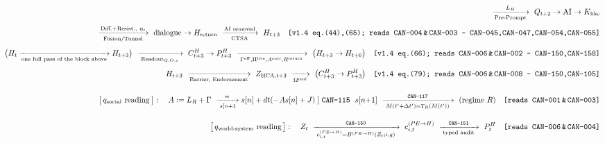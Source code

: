 \begin{equation}
\begin{aligned}
 \ \xrightarrow[\text{Pre-Prompt}]{L_H}\ Q_{t+2}\to\mathrm{AI}\to K_{\mathrm{like}}\\[2pt]
 \xrightarrow[\text{Fusion/Tunnel}]{\text{Diff.}+\text{Resist.},\ \eta_s}\ \text{dialogue}
 \to H_{\mathrm{return}}\ \xrightarrow[\text{CTSA}]{\text{AI removed}}\ H_{t+3}
 \quad\texttt{[v1.4 eq.(44),(65); reads CAN-004\,\&\,CAN-003 -- CAN-045,CAN-047,CAN-054,CAN-055]}\\[4pt]
\big(H_t\xrightarrow[\text{one full pass of the block above}]{}H_{t+3}\big)
 \ \xrightarrow[\;\mathrm{Readout}_{Q,O,c}\;]{}\ C^H_{t+3}\to P^H_{t+3}
 \ \xrightarrow[\;\Gamma^{\mathrm{eff}},\Pi^{\mathrm{live}},A^{\mathrm{corr}},R^{\mathrm{return}}\;]{}\
 \big(H_{t+3}\to H_{t+6}\big)
 \quad\texttt{[v1.4 eq.(66); reads CAN-006\,\&\,CAN-002 -- CAN-150,CAN-158]}\\[4pt]
H_{t+3}\ \xrightarrow[\text{Barrier, Endorsement}]{}\ Z_{\mathrm{HCA},t+3}\ \xrightarrow[\Omega^{\mathrm{real}}]{}\ \big(C^H_{t+3}\to P^H_{t+3}\big)
 \quad\texttt{[v1.4 eq.(79); reads CAN-006\,\&\,CAN-008 -- CAN-150,CAN-105]}\\[10pt]
\big[\,q_{\mathrm{social}}\ \text{reading}\,\big]:\quad
 A:=L_R+\Gamma\ \xrightarrow[\;s[n{+}1]=s[n]+dt(-As[n]+J)\;]{\;\texttt{CAN-115}\;}\ s[n{+}1]
 \ \xrightarrow[\;M(t'{+}\Delta t')=T_R(M(t'))\;]{\;\texttt{CAN-117}\;}\ (\text{regime } R)
 \quad\texttt{[reads CAN-001\,\&\,CAN-003]}\\[10pt]
\big[\,q_{\mathrm{world\text{-}system}}\ \text{reading}\,\big]:\quad
 Z_t\ \xrightarrow[\;c^{(PE\to H)}_{i,t}=B^{(PE\to H)}(Z_t;i,g)\;]{\;\texttt{CAN-150}\;}\ c^{(PE\to H)}_{i,t}
 \ \xrightarrow[\;\text{typed audit}\;]{\;\texttt{CAN-151}\;}\ P^H_t
 \quad\texttt{[reads CAN-006\,\&\,CAN-004]}
\end{aligned}
\end{equation}
\endgroup
